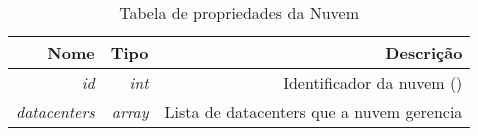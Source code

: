 \begin{table}[!htb]
    \centering
    \caption[Representação da Cloud]{Tabela de propriedades da Nuvem
    \label{tab:cloud-shape}}
    \begin{tabular}{rrr}
        \toprule
            Nome & Tipo & Descrição \\ 
        \midrule
            \textit{id} & \textit{int} & Identificador da nuvem () \\
            \textit{datacenters} & \textit{array} & Lista de datacenters que a nuvem gerencia \\
        \bottomrule
    \end{tabular}
\end{table}